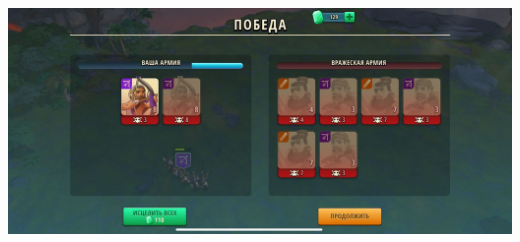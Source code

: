 \noindent\includegraphics[width=\linewidth]{./parts/media/TreasureHunt/40/decoder/photo_2022-04-07_13-16-15.jpg} \newline
